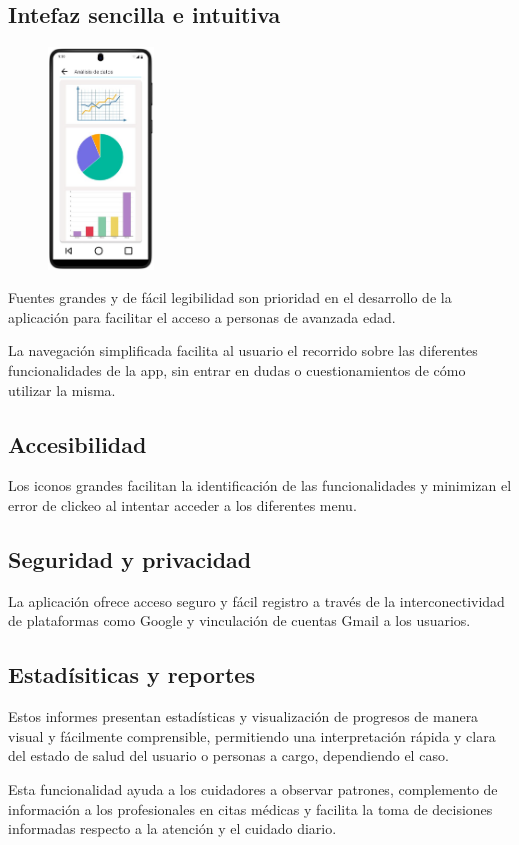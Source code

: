 \documentclass[a4paper,12pt]{article}
\begin{document}
    \subsection{Intefaz sencilla e intuitiva}
    \begin{figure}
        \centering
        \includegraphics[width=0.25\textwidth]{Imagenes/Reportes.jpg}
    \end{figure}
    \par Fuentes grandes y de fácil legibilidad son prioridad en el desarrollo de la aplicación para facilitar el acceso a personas de avanzada edad.
    \par La navegación simplificada facilita al usuario el recorrido sobre las diferentes funcionalidades de la app, sin entrar en dudas o cuestionamientos de cómo utilizar la misma.
    \subsection{Accesibilidad}
    \par Los iconos grandes facilitan la identificación de las funcionalidades y minimizan el error de clickeo al intentar acceder a los diferentes menu.
    \subsection{Seguridad y privacidad}
    \par La aplicación ofrece acceso seguro y fácil registro a través de la interconectividad de plataformas como Google y vinculación de cuentas Gmail a los usuarios.
    \subsection{Estadísiticas y reportes}
    \par Estos informes presentan estadísticas y visualización de progresos de manera visual y fácilmente comprensible, permitiendo una interpretación rápida y clara del estado de salud del usuario o personas a cargo, dependiendo el caso. 
    \par Esta funcionalidad ayuda a los cuidadores a observar patrones, complemento de información a los profesionales en citas médicas y facilita la toma de decisiones informadas respecto a la atención y el cuidado diario.
\end{document}
